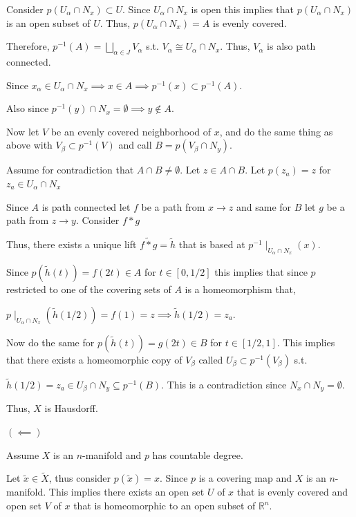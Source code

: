 \documentclass[12pt, letterpaper]{article}
\newcommand{\R}{\mathbb{R}}
\begin{document}
\begin{problemproof}
  Consider $p(U_\alpha \cap N_x) \subset U$. Since $U_\alpha \cap N_x$ is open this implies that $p(U_\alpha \cap N_x)$ is an open subset of $U$. Thus, $p(U_\alpha \cap N_x)=A$ is evenly covered.

  Therefore, $p^{-1}(A)=\bigsqcup_{\alpha \in J} V_\alpha$ s.t. $V_\alpha \cong U_\alpha \cap N_x$. Thus, $V_\alpha$ is also path connected.

  Since $x_\alpha \in U_\alpha \cap N_x \implies x \in A \implies p^{-1}(x) \subset p^{-1}(A)$.

  Also since $p^{-1}(y) \cap N_x = \emptyset \implies y \notin A$.

  Now let $V$ be an evenly covered neighborhood of $x$, and do the same thing as above with $V_\beta \subset p^{-1}(V)$ and call $B=p(V_\beta \cap N_y)$.

  Assume for contradiction that $A \cap B \neq \emptyset$. Let $z \in A \cap B$. Let $p(z_a)=z$ for $z_a \in U_\alpha \cap N_x$

  Since $A$ is path connected let $f$ be a path from $x \to z$ and same for $B$ let $g$ be a path from $z \to y$. Consider $f*g$

  Thus, there exists a unique lift $\widetilde{f*g}=\widetilde{h}$ that is based at $p^{-1}\mid_{U_\alpha \cap N_x}(x)$.

  Since $p(\widetilde{h}(t))=f(2t) \in A$ for $t \in [0,1/2]$ this implies that since $p$ restricted to one of the covering sets of $A$ is a homeomorphism that,
  
  $p\mid_{U_\alpha \cap N_x}(\widetilde{h}(1/2))=f(1)=z \implies \widetilde{h}(1/2)=z_a$.

  Now do the same for $p(\widetilde{h}(t))=g(2t) \in B$ for $t \in [1/2,1]$. This implies that there exists a homeomorphic copy of $V_\beta$ called $U_\beta \subset p^{-1}(V_\beta)$ s.t.

  $\widetilde{h}(1/2)=z_a \in U_\beta \cap N_y \subseteq p^{-1}(B)$. This is a contradiction since $N_x \cap N_y = \emptyset$.

  Thus, $X$ is Hausdorff.

  $(\impliedby)$

  Assume $X$ is an $n$-manifold and $p$ has countable degree.

  Let $\widetilde{x} \in \widetilde{X}$, thus consider $p(\widetilde{x})=x$. Since $p$ is a covering map and $X$ is an $n$-manifold. This implies there exists an open set $U$ of $x$ that is evenly covered and open set $V$ of $x$ that is homeomorphic to an open subset of $\R^n$.


\end{problemproof}
\end{document}
